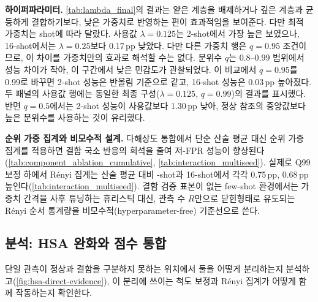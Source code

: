\noindent\textbf{하이퍼파라미터.}
\cref{tab:lambda_final}의 결과는 얕은 계층을 배제하거나 깊은 계층과 균등하게 결합하기보다, 낮은 가중치로 반영하는 편이 효과적임을 보여준다. 다만 최적 가중치는 shot에 따라 달랐다. 사용값 $\lambda=0.125$는 2-shot에서 가장 높은  보였으나, 16-shot에서는 $\lambda=0.25$보다 0.17\,pp 낮았다. 다만 다른 가중치 행은 $q=0.95$ 조건이므로, 이 차이를 가중치만의 효과로 해석할 수는 없다.
분위수 $q$는 0.8--0.99 범위에서 성능 차이가 작아, 이 구간에서 낮은 민감도가 관찰되었다. 이 비교에서 $q=0.95$를 0.99로 바꾸면 2-shot 성능은 반올림 기준으로 같고, 16-shot 성능은 0.03\,pp 높아졌다. 두 패널의 사용값 행에는 동일한 최종 구성($\lambda=0.125$, $q=0.99$)의 결과를 표시했다. 반면 $q=0.5$에서는 2-shot 성능이 사용값보다 1.30\,pp 낮아, 정상 참조의 중앙값보다 높은 분위수를 사용하는 것이 유리했다.



\noindent\textbf{순위 가중 집계와 비모수적 설계.}
다해상도 통합에서 단순 산술 평균 대신 순위 가중 집계를 적용하면 결함 국소 반응의 희석을 줄여 저-FPR 성능이 향상된다(\cref{tab:component_ablation_cumulative}, \cref{tab:interaction_multiseed}).
실제로 Q99 보정 하에서 Rényi 집계는 산술 평균 대비 -shot과 16-shot에서 각각 0.75\,pp, 0.68\,pp 높인다(\cref{tab:interaction_multiseed}).
결함 검증 표본이 없는 few-shot 환경에서는 가중치 간격을 사후 튜닝하는 휴리스틱 대신, 관측 수 $R$만으로 닫힌형태로 유도되는 Rényi 순서 통계량을 비모수적(hyperparameter-free) 기준선으로 쓴다.

\subsection{분석: HSA 완화와 점수 통합}
\label{sec:experiments:mechanism}

단일 관측이 정상과 결함을 구분하지 못하는 위치에서  둘을 어떻게 분리하는지 분석하고(\cref{fig:hsa-direct-evidence}), 이 분리에 쓰이는 척도 보정과 Rényi 집계가 어떻게 함께 작동하는지 확인한다.

